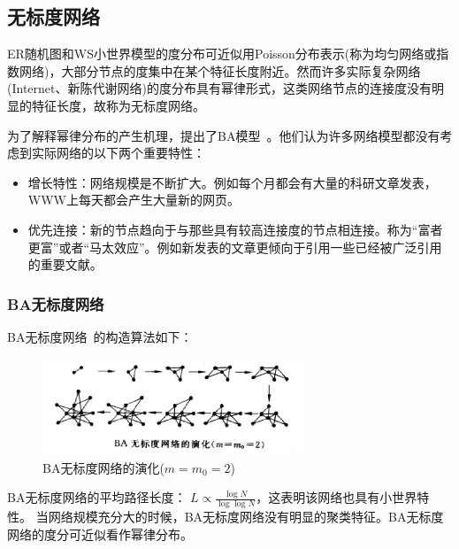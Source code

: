 \documentclass[11pt]{article}
\begin{document}
		
	\subsection{无标度网络}
		ER随机图和WS小世界模型的度分布可近似用Poisson分布表示(称为均匀网络或指数网络)，大部分节点的度集中在某个特征长度附近。然而许多实际复杂网络(Internet、新陈代谢网络)的度分布具有幂律形式，这类网络节点的连接度没有明显的特征长度，故称为无标度网络。\par
		
		为了解释幂律分布的产生机理，提出了BA模型~\cite{paper_04}。他们认为许多网络模型都没有考虑到实际网络的以下两个重要特性：
		\begin{itemize}
			\item 增长特性：网络规模是不断扩大。例如每个月都会有大量的科研文章发表，WWW上每天都会产生大量新的网页。 
			\item 优先连接：新的节点趋向于与那些具有较高连接度的节点相连接。称为“富者更富”或者“马太效应”。例如新发表的文章更倾向于引用一些已经被广泛引用的重要文献。
		\end{itemize}
	
		\subsubsection*{BA无标度网络}
			BA无标度网络~\cite{paper_06}的构造算法如下：
			\begin{center}	
			\end{center}
	
			\begin{figure}[htbp]
				\centering
				\includegraphics[width=0.7\textwidth]{pic/01-BA.png}
				\caption{BA无标度网络的演化($m=m_0=2$)}
			\end{figure}
			\par
			BA无标度网络的平均路径长度： $L \propto \frac{\log N}{\log \log N}$，这表明该网络也具有小世界特性。 当网络规模充分大的时候，BA无标度网络没有明显的聚类特征。BA无标度网络的度分可近似看作幂律分布。\par
\end{document}
